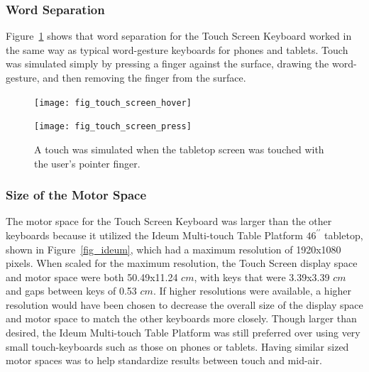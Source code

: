 \subsubsection{Word Separation}
Figure~\ref{touch_screen_press_comparison} shows that word separation for the Touch Screen Keyboard worked in the same way as typical word-gesture keyboards for phones and tablets. Touch was simulated simply by pressing a finger against the surface, drawing the word-gesture, and then removing the finger from the surface.

\begin{figure}[h]
	\centering
	\begin{minipage}[t]{5.8in}
		\begin{minipage}[t]{2.85in}
			\texttt{[image: fig\_touch\_screen\_hover]}
		\end{minipage}
		\begin{minipage}[t]{2.9in}
			\texttt{[image: fig\_touch\_screen\_press]}
		\end{minipage}
	\end{minipage}
	\caption[Touch Screen Word Separation]{A touch was simulated when the tabletop screen was touched with the user's pointer finger.}
	\label{touch_screen_press_comparison}
\end{figure}

\subsubsection{Size of the Motor Space}
The motor space for the Touch Screen Keyboard was larger than the other keyboards because it utilized the Ideum Multi-touch Table Platform $46^{\prime\prime}$ tabletop, shown in Figure~\ref{fig_ideum}, which had a maximum resolution of 1920x1080 pixels. When scaled for the maximum resolution, the Touch Screen display space and motor space were both 50.49x11.24 $cm$, with keys that were 3.39x3.39 $cm$ and gaps between keys of 0.53 $cm$. If higher resolutions were available, a higher resolution would have been chosen to decrease the overall size of the display space and motor space to match the other keyboards more closely. Though larger than desired, the Ideum Multi-touch Table Platform was still preferred over using very small touch-keyboards such as those on phones or tablets. Having similar sized motor spaces was to help standardize results between touch and mid-air.

